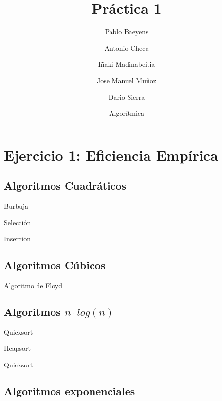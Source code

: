 \documentclass[10pt,compress,usetitleprogressbar,mathserif]{beamer}
\title{Práctica 1}
\author{Pablo Baeyens \and Antonio Checa \and Iñaki Madinabeitia \and Jose Manuel Muñoz \and Dario Sierra}
\date{Algorítmica}
\begin{document}
\maketitle
\section{Ejercicio 1: \large{Eficiencia Empírica }}

\subsection{Algoritmos Cuadráticos}

\begin{frame}{Burbuja}
	
\end{frame}

\begin{frame}{Selección}
	
\end{frame}

\begin{frame}{Inserción}
	
\end{frame}

\subsection{Algoritmos Cúbicos}

\begin{frame}{Algoritmo de Floyd}

\end{frame}

\subsection{Algoritmos $n\cdot log(n)$ }

\begin{frame}{Quicksort}

\end{frame}

\begin{frame}{Heapsort}
	
\end{frame}

\begin{frame}{Quicksort}
	
\end{frame}
\subsection{Algoritmos exponenciales}
\end{document}

